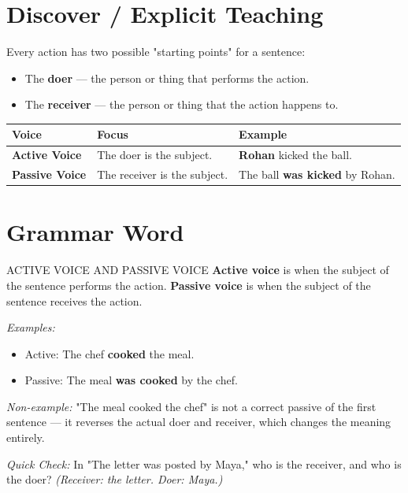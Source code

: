 \section{Discover / Explicit Teaching}
Every action has two possible "starting points" for a sentence:

\begin{itemize}
    \item The \textbf{doer} — the person or thing that performs the action.
    \item The \textbf{receiver} — the person or thing that the action happens to.
\end{itemize}

\begin{table}[h!]
\centering
\begin{tabular}{|l|l|l|}
\hline
\textbf{Voice} & \textbf{Focus} & \textbf{Example} \\
\hline
\textbf{Active Voice} & The doer is the subject. & \textbf{Rohan} kicked the ball. \\
\textbf{Passive Voice} & The receiver is the subject. & The ball \textbf{was kicked} by Rohan. \\
\hline
\end{tabular}
\end{table}

\section{Grammar Word}
\begin{grammarword}{ACTIVE VOICE AND PASSIVE VOICE}
\textbf{Active voice} is when the subject of the sentence performs the action.
\textbf{Passive voice} is when the subject of the sentence receives the action.

\textit{Examples:}
\begin{itemize}
    \item Active: The chef \textbf{cooked} the meal.
    \item Passive: The meal \textbf{was cooked} by the chef.
\end{itemize}

\textit{Non-example:} "The meal cooked the chef" is not a correct passive of the first sentence — it reverses the actual doer and receiver, which changes the meaning entirely.

\textit{Quick Check:} In "The letter was posted by Maya," who is the receiver, and who is the doer? \textit{(Receiver: the letter. Doer: Maya.)}
\end{grammarword}

